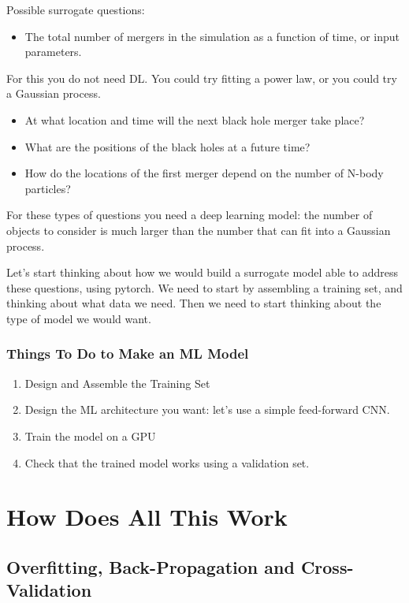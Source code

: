 \documentclass[12pt]{article}
\begin{document}
Possible surrogate questions:
\begin{itemize}
 \item The total number of mergers in the simulation as a function of time, or input parameters.
 \end{itemize}
 For this you do not need DL. You could try fitting a power law, or you could try a Gaussian process.
 \begin{itemize}
 \item At what location and time will the next black hole merger take place?
 \item What are the positions of the black holes at a future time?
 \item How do the locations of the first merger depend on the number of N-body particles?
\end{itemize}
For these types of questions you need a deep learning model: the number of objects to consider is much larger than the number that can fit into a Gaussian process.

Let's start thinking about how we would build a surrogate model able to address these questions, using pytorch. We need to start by assembling a training set, and thinking about what data we need. Then we need to start thinking about the type of model we would want.

\subsubsection{Things To Do to Make an ML Model}
\begin{enumerate}
 \item Design and Assemble the Training Set
 \item Design the ML architecture you want: let's use a simple feed-forward CNN.
 \item Train the model on a GPU
 \item Check that the trained model works using a validation set.
\end{enumerate}

\section{How Does All This Work}

\subsection{Overfitting, Back-Propagation and Cross-Validation}
\end{document}
